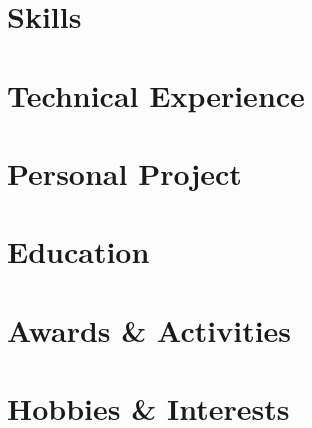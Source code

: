 \documentclass[a4paper,10pt]{article}
\begin{document}


\section{Skills}


\section{Technical Experience}


\section{Personal Project}


\section{Education}


\section{Awards \& Activities}


\section{Hobbies \& Interests}

\end{document}
